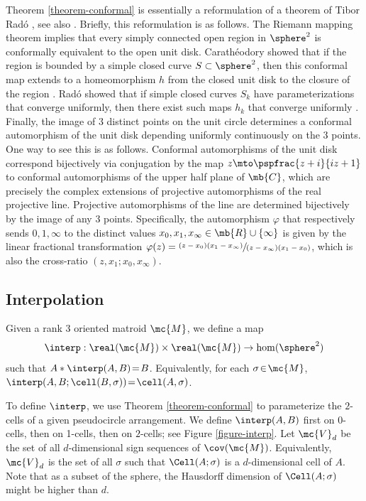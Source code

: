 Theorem \ref{theorem-conformal} is essentially a reformulation of a theorem of Tibor Radó \cite{rado1923representation}, see also \cite[\S II.5 Th.\,2]{goluzin1969geometric}. Briefly, this reformulation is as follows.
The Riemann mapping theorem implies that every simply connected open region in $\sphere^2$ is conformally equivalent to the open unit disk. Carathéodory showed that if the region is bounded by a simple closed curve $S \subset \sphere^2$, then this conformal map extends to a homeomorphism $h$ from the closed unit disk to the closure of the region \cite{caratheodory1913gegenseitige}. Radó showed that if simple closed curves $S_k$ have parameterizations that converge uniformly, then there exist such maps $h_k$ that converge uniformly \cite{rado1923representation}. Finally, the image of $3$ distinct points on the unit circle determines a conformal automorphism of the unit disk depending uniformly continuously on the $3$ points. One way to see this is as follows. Conformal automorphisms of the unit disk correspond bijectively via conjugation by the map $z \mto \pspfrac{z+i}{iz+1}$ to conformal automorphisms of the upper half plane of $\mb{C}$,
which are precisely the complex extensions of projective automorphisms of the real projective line. Projective automorphisms of the line are determined bijectively by the image of any $3$ points.
Specifically, the automorphism $\varphi$ that respectively sends $0,1,\infty$ to the distinct values $x_0,x_1,x_\infty \in \mb{R}\cup\{\infty\}$ is given by the linear fractional transformation
$\varphi(z) = \sfrac{(z-x_0)(x_1-x_\infty)}{(z-x_\infty)(x_1-x_0)}$, which is also the cross-ratio $(z,x_1;x_0,x_\infty)$.

\subsection{Interpolation}

Given a rank $3$ oriented matroid $\mc{M}$, we define a map
\[ \interp : \real(\mc{M}) \times \real(\mc{M}) \to \hom(\sphere^2) \]
such that $A*\interp(A,B)\!=\! B$.
Equivalently, for each $\sigma \!\in\! \mc{M}$, $\interp(A,B;\cell(B,\sigma))\!=\!\cell(A,\sigma)$.

To define $\interp$, we use Theorem \ref{theorem-conformal} to parameterize the $2$-cells of a given pseudocircle arrangement.
We define $\interp(A,B)$ first on 0-cells, then on 1-cells, then on $2$-cells; see Figure \ref{figure-interp}. Let $\mc{V}_d$ be the set of all $d$-dimensional sign sequences of $\cov(\mc{M})$. Equivalently, $\mc{V}_d$ is the set of all $\sigma$ such that $\Cell(A;\sigma)$ is a $d$-dimensional cell of $A$.
Note that as a subset of the sphere, the Hausdorff dimension of $\Cell(A;\sigma)$ might be higher than $d$.

